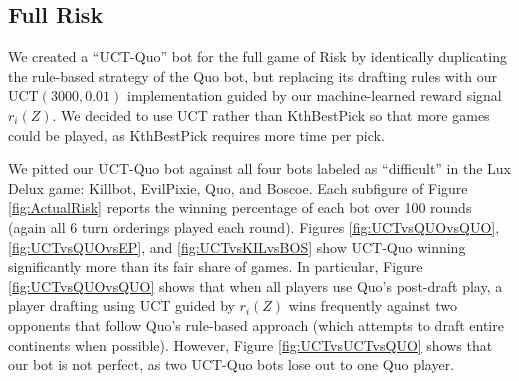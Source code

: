 \documentclass[letterpaper]{article}
\numberwithin{equation}{section}
\numberwithin{theorem}{section}
\numberwithin{lemma}{section}
\numberwithin{df}{section}
\begin{document}
\subsection{Full Risk}


We created a ``UCT-Quo'' bot for the full game of Risk by identically duplicating the rule-based strategy of the Quo bot, but replacing its drafting rules with our UCT$(3000,0.01)$ implementation guided by our machine-learned reward signal $r_i(Z)$.  We decided to use UCT rather than KthBestPick so that more games could be played, as KthBestPick requires more time per pick.  

We pitted our UCT-Quo bot against all four bots labeled as ``difficult'' in the Lux Delux game: Killbot, EvilPixie, Quo, and Boscoe.  Each subfigure of Figure \ref{fig:ActualRisk} reports the winning percentage of each bot over 100 rounds (again all 6 turn orderings played each round).  Figures \ref{fig:UCTvsQUOvsQUO}, \ref{fig:UCTvsQUOvsEP}, and \ref{fig:UCTvsKILvsBOS} show UCT-Quo winning significantly more than its fair share of games.  In particular, Figure \ref{fig:UCTvsQUOvsQUO} shows that when all players use Quo's post-draft play, a player drafting using UCT guided by $r_i(Z)$ wins frequently against two opponents that follow Quo's rule-based approach (which attempts to draft entire continents when possible).  However, Figure \ref{fig:UCTvsUCTvsQUO} shows that our bot is not perfect, as two UCT-Quo bots lose out to one Quo player.  

\end{document}
